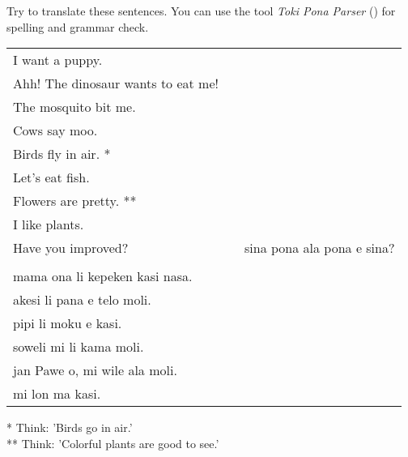 Try to translate these sentences. 
You can use the tool \textit{Toki Pona Parser} (\cite{www:rowa:02}) for spelling and grammar check. 

\begin{supertabular}{p{5,5cm}|ll}
I want a puppy. &&   \\ %
Ahh! The dinosaur wants to eat me!  &&  \\ %
The mosquito bit me.  &&  \\ %
Cows say moo.  &&  \\ %
Birds fly in air. * &&  \\ %
Let's eat fish.  &&  \\ %
Flowers are pretty. ** &&  \\ %
I like plants. &&   \\ %
Have you improved? && sina pona ala pona e sina? \\ %
 && \\ %
mama ona li kepeken kasi nasa.  &&  \\ %
akesi li pana e telo moli. &&  \\  %
pipi li moku e kasi.  &&  \\ %
soweli mi li kama moli.  &&  \\ %
jan Pawe o, mi wile ala moli. && \\   %
mi lon ma kasi. &&   \\ %
\end{supertabular} 

* Think: 'Birds go in air.' \\
** Think: 'Colorful plants are good to see.' 

